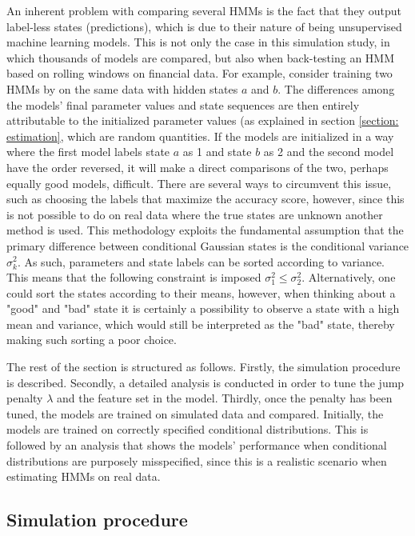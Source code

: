 An inherent problem with comparing several HMMs is the fact that they output label-less states (predictions), which is due to their nature of being unsupervised machine learning models. This is not only the case in this simulation study, in which thousands of models are compared, but also when back-testing an HMM based on rolling windows on financial data. For example, consider training two HMMs by \mle on the same data with hidden states $a$ and $b$. The differences among the models' final parameter values and state sequences are then entirely attributable to the initialized parameter values (as explained in section \ref{section: estimation}, which are random quantities. If the models are initialized in a way where the first model labels state $a$ as 1 and state $b$ as 2 and the second model have the order reversed, it will make a direct comparisons of the two, perhaps equally good models, difficult. There are several ways to circumvent this issue, such as choosing the labels that maximize the accuracy score, however, since this is not possible to do on real data where the true states are unknown another method is used. This methodology exploits the fundamental assumption that the primary difference between conditional Gaussian states is the conditional variance $\sigma_k^2$. As such, parameters and state labels can be sorted according to variance. This means that the following constraint is imposed $\sigma_1^2 \leq \sigma_2^2$. Alternatively, one could sort the states according to their means, however, when thinking about a "good" and "bad" state it is certainly a possibility to observe a state with a high mean and variance, which would still be interpreted as the "bad" state, thereby making such sorting a poor choice.


The rest of the section is structured as follows. Firstly, the simulation procedure is described. Secondly, a detailed analysis is conducted in order to tune the jump penalty $\lambda$ and the feature set in the \jump model. Thirdly, once the penalty has been tuned, the models are trained on simulated data and compared. Initially, the models are trained on correctly specified conditional distributions. This is followed by an analysis that shows the models' performance when conditional distributions are purposely misspecified, since this is a realistic scenario when estimating HMMs on real data.

\subsection{Simulation procedure}

